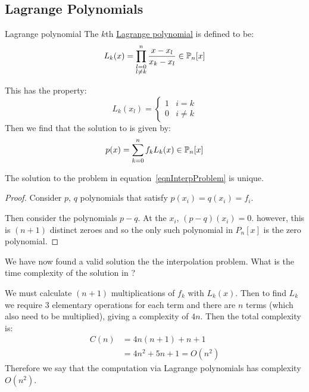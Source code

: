 \documentclass[../Main.tex]{subfiles}
\begin{document}
\subsection{Lagrange Polynomials}
\begin{definition}{Lagrange polynomial}
    The $k$th \underline{Lagrange polynomial} is defined to be:
    \begin{equation}
        L_k(x) = \prod_{\substack{l = 0\\l \neq k}}^{n} \frac{x - x_l}{x_k - x_l} \in \P_n[x]
        \label{eqnLagrangePoly}
    \end{equation}
\end{definition}
This has the property:
\begin{equation}
    L_k(x_l) =
    \begin{cases}
        1 & i = k \\
        0 & i \neq k
    \end{cases}
    \label{eqnLagrangeProperty}
\end{equation}
Then we find that the solution to  is given by:
\begin{equation}
    p(x) = \sum_{k=0}^{n} f_k L_k(x) \in \P_n[x]
    \label{eqnInterpWithLagrange}
\end{equation}
\begin{proposition}
    The solution to the problem in equation~\ref{eqnInterpProblem} is unique.
    \label{propInterpUnique}
\end{proposition}
\begin{proof}
    Consider $p$, $q$ polynomials that satisfy $p(x_i) = q(x_i) = f_i$.

    Then consider the polynomials $p - q$. At the $x_i$, $(p - q)(x_i) = 0$. however, this is $(n+1)$ distinct zeroes and so the only such polynomial in $P_n[x]$ is the zero polynomial.
\end{proof}
We have now found a valid solution the the interpolation problem. What is the time complexity of the solution in ?

We must calculate $(n+1)$ multiplications of $f_k$ with $L_k(x)$. Then to find $L_k$ we require 3 elementary operations for each term and there are $n$ terms (which also need to be multiplied), giving a complexity of $4n$. Then the total complexity is:
\begin{align*}
    C(n) &= 4n(n+1) + n + 1 \\
    &= 4n^2 + 5n + 1 = O(n^2)
\end{align*}
Therefore we say that the computation via Lagrange polynomials has complexity $O(n^2)$.
\end{document}

